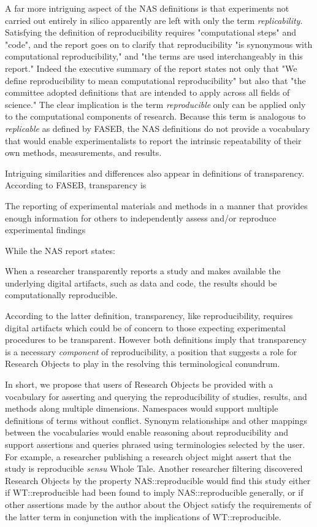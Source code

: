 A far more intriguing aspect of the NAS definitions is that experiments not carried out entirely in silico apparently are 
	left with only the term \emph{replicability}.
Satisfying the definition of reproducibility requires "computational steps" and "code", and the report goes on to clarify 
	that reproducibility "is synonymous with computational reproducibility,"  and "the terms are used interchangeably in this report."
Indeed the executive summary of the report states not only that "We define reproducibility to mean computational reproducibility" 
	but also that "the committee adopted definitions that are intended to apply across all fields of science."
The clear implication is the term \emph{reproducible} only can be applied only to the computational components of research.
Because this term is analogous to \emph{replicable} as defined by FASEB, the NAS definitions do not provide a vocabulary 
	that would enable experimentalists to report the intrinsic repeatability of their own methods, measurements, and results. 

Intriguing similarities and differences also appear in definitions of transparency. According to FASEB, transparency is

	The reporting of experimental materials and methods in a manner that provides enough information 
	for others to independently assess and/or reproduce experimental findings

While the NAS report states:

	When a researcher transparently reports a study and makes available the underlying digital artifacts, such as data and code, 
	the results should be computationally reproducible.

According to the latter definition, transparency, like reproducibility, requires digital artifacts which could be of concern to
	those expecting experimental procedures to be transparent.
However both definitions imply that transparency is a necessary \emph{component} of reproducibility, a position that
	suggests a role for Research Objects to play in the resolving this terminological conundrum.

In short, we propose that users of Research Objects be provided with a vocabulary for asserting and querying the reproducibility
	of studies, results, and methods along multiple dimensions. 
Namespaces would support multiple definitions of terms without conflict.
Synonym relationships and other mappings between the vocabularies would enable reasoning about reproducibility
	 and support assertions and queries phrased using terminologies selected by the user.
For example, a researcher publishing a research object might assert that the study is reproducible \emph{sensu} Whole Tale.
Another researcher filtering discovered Research Objects by the property NAS::reproducible would find this study
	either if WT::reproducible had been found to imply NAS::reproducible generally, or if other assertions made by the author
	about the Object satisfy the requirements of the latter term in conjunction with the implications of  WT::reproducible.

